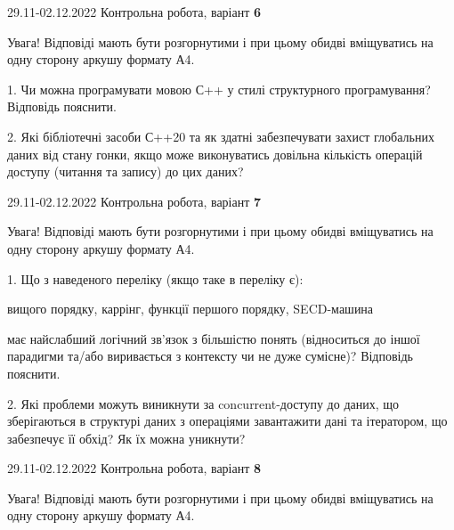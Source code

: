 \documentclass[11pt, ukrainian]{article}
\begin{document}
\vspace{4mm}



{29.11-02.12.2022 Контрольна робота, варіант  \No \textbf { 6 }\par}
Увага! Відповіді мають бути розгорнутими і при цьому обидві вміщуватись на одну сторону аркушу формату А4.

{
\begin {large}

1. Чи можна програмувати мовою С++ у стилі структурного програмування? Відповідь пояснити.%

2. Які бібліотечні засоби С++20 та як здатні забезпечувати захист глобальних даних від стану гонки, якщо може виконуватись довільна кількість операцій доступу (читання та запису) до цих даних?

\end {large}}

\vspace{4mm}



{29.11-02.12.2022 Контрольна робота, варіант  \No \textbf { 7 }\par}
Увага! Відповіді мають бути розгорнутими і при цьому обидві вміщуватись на одну сторону аркушу формату А4.

{
\begin {large}

1. Що з наведеного переліку (якщо таке в переліку є):

\vspace{4mm}
 вищого порядку, каррінг, функції першого порядку, SECD-машина

\vspace{4mm}
має найслабший логічний зв’язок з більшістю понять (відноситься до іншої парадигми та/або виривається з контексту чи не дуже сумісне)? Відповідь пояснити.


2. Які проблеми можуть виникнути за concurrent-доступу до даних, що зберігаються в структурі даних з операціями завантажити дані та ітератором, що забезпечує її обхід? Як їх можна уникнути?

\end {large}}

\vspace{4mm}



{29.11-02.12.2022 Контрольна робота, варіант  \No \textbf { 8 }\par}
Увага! Відповіді мають бути розгорнутими і при цьому обидві вміщуватись на одну сторону аркушу формату А4.
\end{document}
